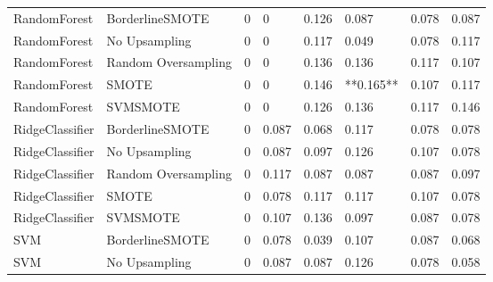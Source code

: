 \begin{tabular}{llllllll}
                RandomForest &     BorderlineSMOTE &     0 &                         0 &                 0.126 &                  0.087 &                                   0.078 &    0.087 \\
                RandomForest &       No Upsampling &     0 &                         0 &                 0.117 &                  0.049 &                                   0.078 &    0.117 \\
                RandomForest & Random Oversampling &     0 &                         0 &                 0.136 &                  0.136 &                                   0.117 &    0.107 \\
                RandomForest &               SMOTE &     0 &                         0 &                 0.146 &              **0.165** &                                   0.107 &    0.117 \\
                RandomForest &            SVMSMOTE &     0 &                         0 &                 0.126 &                  0.136 &                                   0.117 &    0.146 \\
             RidgeClassifier &     BorderlineSMOTE &     0 &                     0.087 &                 0.068 &                  0.117 &                                   0.078 &    0.078 \\
             RidgeClassifier &       No Upsampling &     0 &                     0.087 &                 0.097 &                  0.126 &                                   0.107 &    0.078 \\
             RidgeClassifier & Random Oversampling &     0 &                     0.117 &                 0.087 &                  0.087 &                                   0.087 &    0.097 \\
             RidgeClassifier &               SMOTE &     0 &                     0.078 &                 0.117 &                  0.117 &                                   0.107 &    0.078 \\
             RidgeClassifier &            SVMSMOTE &     0 &                     0.107 &                 0.136 &                  0.097 &                                   0.087 &    0.078 \\
                         SVM &     BorderlineSMOTE &     0 &                     0.078 &                 0.039 &                  0.107 &                                   0.087 &    0.068 \\
                         SVM &       No Upsampling &     0 &                     0.087 &                 0.087 &                  0.126 &                                   0.078 &    0.058 \\

\end{tabular}
